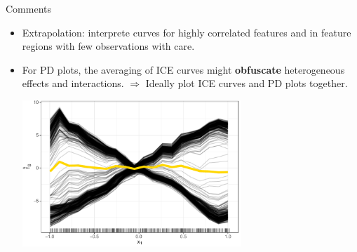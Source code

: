 \documentclass[11pt,compress,t,notes=noshow, aspectratio=169, xcolor=table]{beamer}
\begin{document}
\begin{vbframe}{Comments}
\begin{itemize}
\item Extrapolation: interprete curves for highly correlated features and in feature regions with few observations with care.

\item For PD plots, the averaging of ICE curves might \textbf{obfuscate} heterogeneous effects and interactions. \newline \(\Rightarrow\) Ideally plot ICE curves and PD plots together.

\begin{center}\includegraphics[width=0.65\textwidth]{figure/pdp_xor.pdf} \end{center}
\end{itemize}

\end{vbframe}


\endlecture
\end{document}

